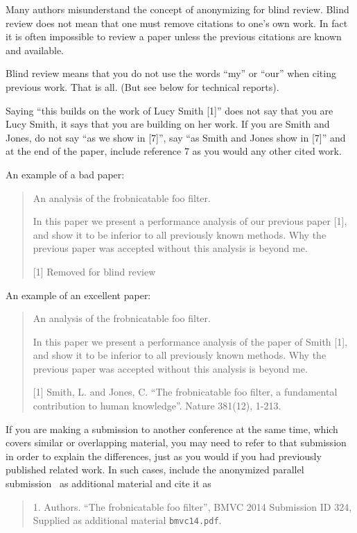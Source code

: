 \documentclass[runningheads]{llncs}
\begin{document}
Many authors misunderstand the concept of anonymizing for blind
review. Blind review does not mean that one must remove
citations to one's own work. In fact it is often impossible to
review a paper unless the previous citations are known and
available.

Blind review means that you do not use the words ``my'' or ``our''
when citing previous work.  That is all.  (But see below for
technical reports).

Saying ``this builds on the work of Lucy Smith [1]'' does not say
that you are Lucy Smith, it says that you are building on her
work.  If you are Smith and Jones, do not say ``as we show in
[7]'', say ``as Smith and Jones show in [7]'' and at the end of the
paper, include reference 7 as you would any other cited work.

An example of a bad paper:
\begin{quote}
\begin{center}
    An analysis of the frobnicatable foo filter.
\end{center}

   In this paper we present a performance analysis of our
   previous paper [1], and show it to be inferior to all
   previously known methods.  Why the previous paper was
   accepted without this analysis is beyond me.

   [1] Removed for blind review
\end{quote}


An example of an excellent paper:

\begin{quote}
\begin{center}
     An analysis of the frobnicatable foo filter.
\end{center}

   In this paper we present a performance analysis of the
   paper of Smith [1], and show it to be inferior to
   all previously known methods.  Why the previous paper
   was accepted without this analysis is beyond me.

   [1] Smith, L. and Jones, C. ``The frobnicatable foo
   filter, a fundamental contribution to human knowledge''.
   Nature 381(12), 1-213.
\end{quote}

If you are making a submission to another conference at the same
time, which covers similar or overlapping material, you may need
to refer to that submission in order to explain the differences,
just as you would if you had previously published related work. In
such cases, include the anonymized parallel
submission~\cite{Authors14} as additional material and cite it as
\begin{quote}
1. Authors. ``The frobnicatable foo filter'', BMVC 2014 Submission
ID 324, Supplied as additional material {\tt bmvc14.pdf}.
\end{quote}
\end{document}
